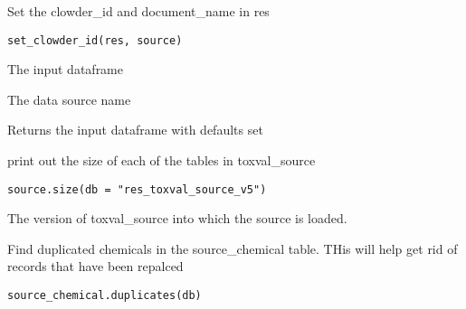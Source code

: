 \documentclass[letterpaper]{book}
\begin{document}
%
\begin{Description}\relax
Set the clowder\_id and document\_name in res
\end{Description}
%
\begin{Usage}
\begin{verbatim}
set_clowder_id(res, source)
\end{verbatim}
\end{Usage}
%
\begin{Arguments}
\begin{ldescription}
\item[\code{res}] The input dataframe

\item[\code{source}] The data source name
\end{ldescription}
\end{Arguments}
%
\begin{Value}
Returns the input dataframe with defaults set
\end{Value}
%
\begin{Description}\relax
print out the size of each of the tables in toxval\_source
\end{Description}
%
\begin{Usage}
\begin{verbatim}
source.size(db = "res_toxval_source_v5")
\end{verbatim}
\end{Usage}
%
\begin{Arguments}
\begin{ldescription}
\item[\code{db}] The version of toxval\_source into which the source is loaded.
\end{ldescription}
\end{Arguments}
%
\begin{Description}\relax
Find duplicated chemicals in the source\_chemical table. THis will help get rid of
records that have been repalced
\end{Description}
%
\begin{Usage}
\begin{verbatim}
source_chemical.duplicates(db)
\end{verbatim}
\end{Usage}
\end{document}
